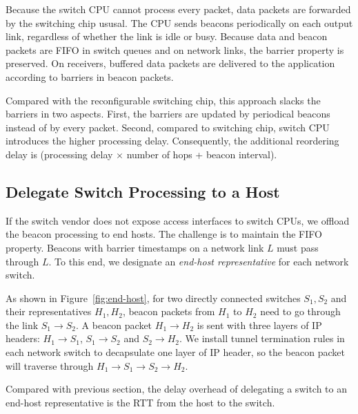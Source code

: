 Because the switch CPU cannot process every packet, data packets are forwarded by the switching chip ususal. 
The CPU sends beacons periodically on each output link, regardless of whether the link is idle or busy.
Because data and beacon packets are FIFO in switch queues and on network links, the barrier property is preserved. On receivers, buffered data packets are delivered to the application according to barriers in beacon packets.

Compared with the reconfigurable switching chip, this approach slacks the barriers in two aspects.
First, the barriers are updated by periodical beacons instead of by every packet.
Second, compared to switching chip, switch CPU introduces the higher processing delay. Consequently, the additional reordering delay is (processing delay $\times$ number of hops + beacon interval).

\subsection{Delegate Switch Processing to a Host}
\label{sec:end-host}

If the switch vendor does not expose access interfaces to switch CPUs, we offload the beacon processing to end hosts. The challenge is to maintain the FIFO property. Beacons with barrier timestamps on a network link $L$ must pass through $L$. To this end, we designate an \textit{end-host representative} for each network switch. %

As shown in Figure~\ref{fig:end-host}, for two directly connected switches $S_1, S_2$ and their representatives $H_1, H_2$, beacon packets from $H_1$ to $H_2$ need to go through the link $S_1 \rightarrow S_2$. A beacon packet $H_1 \rightarrow H_2$ is sent with three layers of IP headers: $H_1 \rightarrow S_1$, $S_1 \rightarrow S_2$ and $S_2 \rightarrow H_2$.
We install tunnel termination rules in each network switch to decapsulate one layer of IP header, so the beacon packet will traverse through $H_1 \rightarrow S_1 \rightarrow S_2 \rightarrow H_2$.

Compared with previous section, the delay overhead of delegating a switch to an end-host representative is the RTT from the host to the switch.
